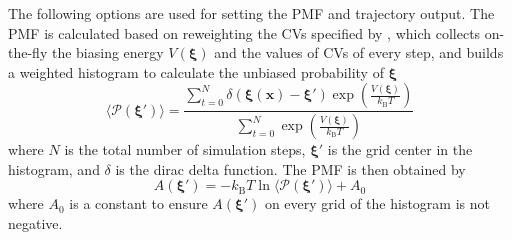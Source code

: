 The following options are used for setting the PMF and trajectory output. The PMF is calculated based on reweighting the CVs specified by , which collects on-the-fly the biasing energy $V(\boldsymbol{\xi})$ and the values of CVs of every step, and builds a weighted histogram to calculate the unbiased probability of $\boldsymbol{\xi}$
\begin{equation}
\langle \mathcal{P}(\boldsymbol{\xi}') \rangle = \dfrac{\sum_{t=0}^N \delta(\boldsymbol{\xi}(\mathbf{x})-\boldsymbol{\xi}') \exp\left(\frac{V(\boldsymbol{\xi})}{k_{\mathrm{B}} T}\right)}{\sum_{t=0}^N \exp\left(\frac{V(\boldsymbol{\xi})}{k_{\mathrm{B}} T}\right)}
\end{equation}
where $N$ is the total number of simulation steps, $\boldsymbol{\xi}'$ is the grid center in the histogram, and $\delta$ is the dirac delta function. The PMF is then obtained by
\begin{equation}
A(\boldsymbol{\xi}')=-k_{\mathrm{B}} T \ln{\langle \mathcal{P}(\boldsymbol{\xi}') \rangle} + A_0
\end{equation}
where $A_0$ is a constant to ensure $A(\boldsymbol{\xi}')$ on every grid of the histogram is not negative.

